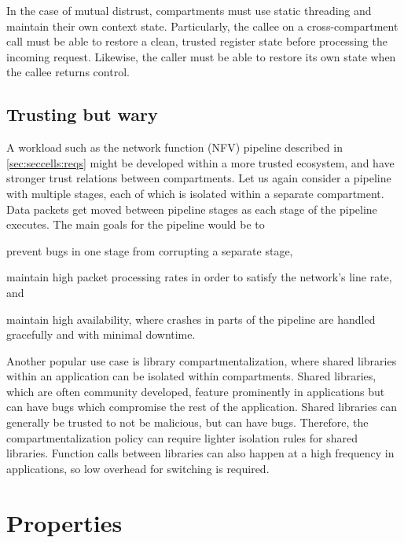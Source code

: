 In the case of mutual distrust, compartments must use static threading 
and maintain their own context state.
Particularly, the callee on a cross-compartment call must be able to 
restore a clean, trusted register state before processing the incoming request.
Likewise, the caller must be able to restore its own state when the callee
returns control.

\subsection{Trusting but wary}
\label{sec:compreview:usecases:wary}
A workload such as the network function (NFV) pipeline described in 
\autoref{sec:seccells:reqs} might be developed within a more trusted
ecosystem, and have stronger trust relations between compartments.
Let us again consider a pipeline with multiple stages, each of which
is isolated within a separate compartment.
Data packets get moved between pipeline stages as each stage of the
pipeline executes.
The main goals for the pipeline would be to 
\begin{inparaenum}
      \item prevent bugs in one stage from corrupting a separate stage, 
      \item maintain high packet processing rates in order to satisfy
            the network's line rate, and
      \item maintain high availability, where crashes in parts of the
            pipeline are handled gracefully and with minimal downtime.  
\end{inparaenum}

Another popular use case is library compartmentalization, where shared
libraries within an application can be isolated within compartments.
Shared libraries, which are often community developed, feature prominently
in applications but can have bugs which compromise the rest of the
application.
Shared libraries can generally be trusted to not be malicious, but can
have bugs. 
Therefore, the compartmentalization policy can require lighter isolation
rules for shared libraries.
Function calls between libraries can also happen at a high frequency in
applications, so low overhead for switching is required.


\section{Properties}
\label{sec:compreview:properties}

